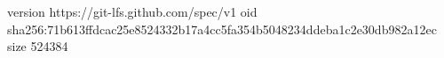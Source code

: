 version https://git-lfs.github.com/spec/v1
oid sha256:71b613ffdcac25e8524332b17a4cc5fa354b5048234ddeba1c2e30db982a12ec
size 524384
